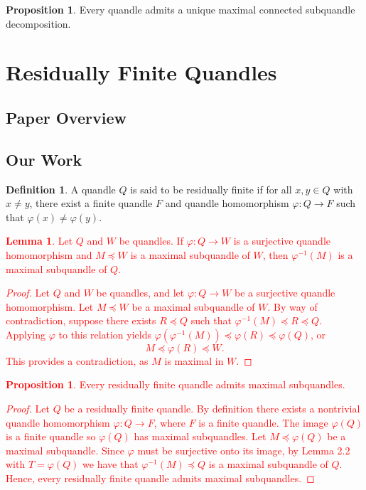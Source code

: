 \documentclass[reqno,dvipsnames]{amsart}
\renewcommand{\phi}{\varphi}
\theoremstyle{definition}
\newtheorem{proposition}[theorem]{Proposition}
\newtheorem{lemma}[theorem]{Lemma}
\newtheorem{definition}[theorem]{Definition}
\begin{document}
\begin{proposition}
Every quandle admits a unique maximal connected subquandle decomposition.
\end{proposition}

\newpage

\section{Residually Finite Quandles}

\subsection{Paper Overview}

\subsection{Our Work}

\begin{definition}
A quandle $Q$ is said to be residually finite if for all $x,y\in Q$ with
$x\neq y$, there exist a finite quandle $F$ and quandle homomorphism $\phi:Q\to F$ such that $\phi(x)\neq\phi(y)$.
\end{definition}

\textcolor{red}{
\begin{lemma}
Let $Q$ and $W$ be quandles. If $\phi:Q\to W$ is a surjective quandle homomorphism and $M\preceq W$ is a maximal subquandle of $W$, then $\phi^{-1}(M)$ is a maximal subquandle of $Q$.
\end{lemma}
\begin{proof}
Let $Q$ and $W$ be quandles, and let $\phi:Q\to W$ be a surjective quandle homomorphism. Let $M\preceq W$ be a maximal subquandle of $W$. By way of contradiction, suppose there exists $R\preceq Q$ such that $\phi^{-1}(M)\preceq R\preceq Q$. Applying $\phi$ to this relation yields $\phi(\phi^{-1}(M))\preceq \phi(R)\preceq\phi(Q)$, or
\[M\preceq\phi(R)\preceq W.\]
This provides a contradiction, as $M$ is maximal in $W$.
\end{proof}
\begin{proposition}
Every residually finite quandle admits maximal subquandles.
\end{proposition}
\begin{proof}
Let $Q$ be a residually finite quandle. By definition there exists a nontrivial quandle homomorphism $\phi:Q\to F$, where $F$ is a finite quandle. The image $\phi(Q)$ is a finite quandle so $\phi(Q)$ has maximal subquandles. Let $M\preceq\phi(Q)$ be a maximal subquandle. Since $\phi$ must be surjective onto its image, by Lemma 2.2 with $T=\phi(Q)$ we have that $\phi^{-1}(M)\preceq Q$ is a maximal subquandle of $Q$. Hence, every residually finite quandle admits maximal subquandles.
\end{proof}
}
\end{document}
